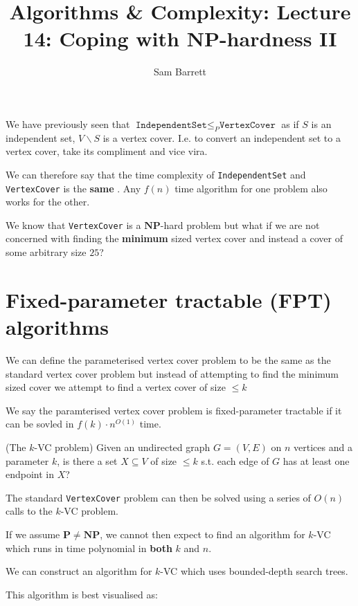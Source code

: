 \documentclass{article}
\title{Algorithms \& Complexity: Lecture 14: Coping with $\mathbf{NP}$-hardness II}
\author{Sam Barrett}
\newcommand{\NP}{\mathbf{NP}}
\renewcommand{\P}{\mathbf{P}}
\begin{document}
\maketitle

We have previously seen that $\texttt{IndependentSet} \leq_{P} \texttt{VertexCover}  $ as if $S$ is an independent set, $V\backslash S$ is a vertex cover. I.e. to convert an independent set to a vertex cover, take its compliment and vice vira.

We can therefore say that the time complexity of \texttt{IndependentSet} and \texttt{VertexCover} is the \textbf{same} . Any $f(n)$ time algorithm for one problem also works for the other.

We know that \texttt{VertexCover} is a $\NP$-hard problem but what if we are not concerned with finding the \textbf{minimum} sized vertex cover and instead a cover of some arbitrary size $25$?

\section{Fixed-parameter tractable (FPT) algorithms}

We can define the parameterised vertex cover problem to be the same as the standard vertex cover problem but instead of attempting to find the minimum sized cover we attempt to find a vertex cover of size $\leq k$

We say the paramterised vertex cover problem is fixed-parameter tractable if it can be sovled in $f(k) \cdot n^{O(1)}$ time.

\begin{problem}(The $k$-VC problem)
  Given an undirected graph $G=(V,E)$ on $n$ vertices and a parameter $k$, is there a set $X\subseteq V$ of size $\leq k$ s.t. each edge of $G$ has at least one endpoint in $X$?
\end{problem}

The standard \texttt{VertexCover} problem can then be solved using a series of $O(n)$ calls to the $k$-VC  problem.

If we assume $\P \neq \NP$, we cannot then expect to find an algorithm for $k$-VC which runs in time polynomial in \textbf{both} $k$ and $n$.

We can construct an algorithm for $k$-VC which uses bounded-depth search trees.

This algorithm is best visualised as:
\end{document}
